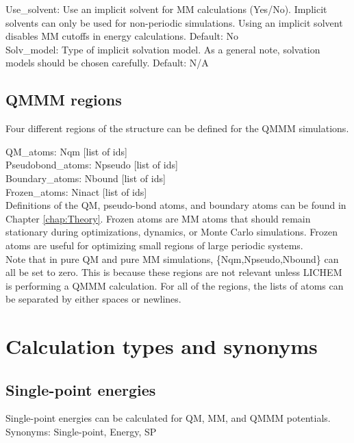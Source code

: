 \documentclass[12pt]{report}
\begin{document}
Use\_solvent: Use an implicit solvent for MM calculations (Yes/No).
Implicit solvents can only be used for non-periodic simulations.
Using an implicit solvent disables MM cutoffs in energy calculations.
Default: No \\

Solv\_model: Type of implicit solvation model.
As a general note, solvation models should be chosen carefully.
Default: N/A

\subsection{QMMM regions}

Four different regions of the structure can be defined for the QMMM
simulations.

QM\_atoms: Nqm [list of ids] \\

Pseudobond\_atoms: Npseudo [list of ids] \\

Boundary\_atoms: Nbound [list of ids] \\

Frozen\_atoms: Ninact [list of ids] \\

Definitions of the QM, pseudo-bond atoms, and boundary atoms can be found in
Chapter \ref{chap:Theory}.
Frozen atoms are MM atoms that should remain stationary during optimizations,
dynamics, or Monte Carlo simulations.
Frozen atoms are useful for optimizing small regions of large periodic
systems. \\

Note that in pure QM and pure MM simulations, \{Nqm,Npseudo,Nbound\} can all
be set to zero.
This is because these regions are not relevant unless LICHEM is performing a
QMMM calculation.
For all of the regions, the lists of atoms can be separated by either spaces
or newlines.

\section{Calculation types and synonyms}
\label{sec:CalcTyp}

\subsection{Single-point energies}

Single-point energies can be calculated for QM, MM, and QMMM potentials.
Synonyms: Single-point, Energy, SP
\end{document}
